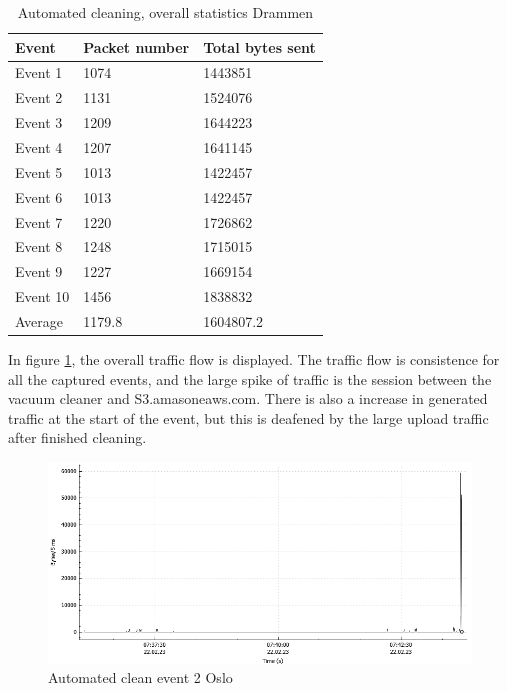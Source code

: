 \begin{table}[H]
\centering
\caption{Automated cleaning, overall statistics Drammen}
\label{tab:ACoverallDRA}
\begin{tabular}{|l|l|l|}
\hline
\textbf{Event} & \textbf{Packet number} & \textbf{Total bytes sent} \\ \hline
Event 1        & 1074                   & 1443851                   \\ \hline
Event 2        & 1131                   & 1524076                   \\ \hline
Event 3        & 1209                   & 1644223                   \\ \hline
Event 4        & 1207                   & 1641145                   \\ \hline
Event 5        & 1013                   & 1422457                   \\ \hline
Event 6        & 1013                   & 1422457                   \\ \hline
Event 7        & 1220                   & 1726862                   \\ \hline
Event 8        & 1248                   & 1715015                   \\ \hline
Event 9        & 1227                   & 1669154                   \\ \hline
Event 10       & 1456                   & 1838832                   \\ \hline
Average        & 1179.8                 & 1604807.2                 \\ \hline
\end{tabular}
\end{table}

In figure \ref{fig:Ac-graph}, the overall traffic flow is displayed. The traffic flow is consistence for all the captured events, and the large spike of traffic is the session between the vacuum cleaner and S3.amasoneaws.com. There is also a increase in generated traffic at the start of the event, but this is 
deafened by the large upload traffic after finished cleaning.

\begin{figure}[H]
    \centering
    \includegraphics[width=\textwidth]{figures/AC-graph.png}
    \caption{Automated clean event 2 Oslo}
    \label{fig:Ac-graph}
\end{figure}

